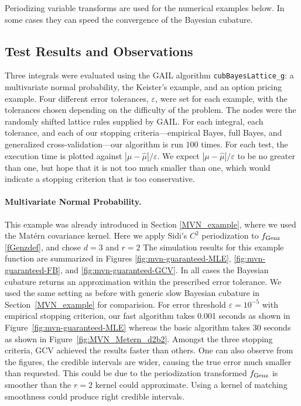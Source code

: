 \documentclass[twocolumn]{svjour3}          %
\newcommand{\hmu}{\widehat{\mu}}
\newcommand{\code}[1]{\texttt{#1}}
\def\abs#1{\ensuremath{\left \lvert #1 \right \rvert}}
\newcommand\figref{Figure~\ref}
\newcommand\secref{Section~\ref}
\begin{document}
Periodizing variable transforms are used for the numerical examples below.  In some cases they can speed the convergence of the Bayesian cubature. 
	



\subsection{Test Results and Observations}

Three integrals were evaluated using the GAIL algorithm \code{cubBayesLattice\_g}:  a multivariate normal probability, the Keister's example, and an option pricing example.  Four different error tolerances, $\varepsilon$,  were set for each example, with the tolerances chosen depending on the difficulty of the problem.  The nodes were the randomly shifted lattice rules supplied by GAIL.  For each integral,  each tolerance, and each of our stopping criteria---empirical Bayes, full Bayes, and generalized cross-validation---our algorithm is run  $100$ times.  For each test, the execution time is plotted against $\abs{\mu - \hmu}/\varepsilon$.  We expect $\abs{\mu - \hmu}/\varepsilon$ to be no greater than one, but hope that it is not too much smaller than one, which would indicate a stopping criterion that is too conservative.


\paragraph{Multivariate Normal Probability.}

This example was already introduced in Section \ref{MVN_example}, where we used the Mat\'ern covariance kernel.  Here we apply Sidi's $C^2$  periodization to $ f_{\textup{Genz}}$ \eqref{fGenzdef}, and chose $d=3$ and $r=2$ The simulation results for this example function are summarized in Figures \ref{fig:mvn-guaranteed-MLE}, \ref{fig:mvn-guaranteed-FB}, and \ref{fig:mvn-guaranteed-GCV}.  In all cases the Bayesian cubature returns an approximation within the prescribed error tolerance. We used the same setting as before with generic slow Bayesian cubature in \secref{MVN_example} for comparision. For error threshold $\varepsilon=10^{-5}$ with empirical stopping criterion, our fast algorithm takes 0.001 seconds as shown in \figref{fig:mvn-guaranteed-MLE} whereas the basic algorithm takes 30 seconds as shown in \figref{fig:MVN_Metern_d2b2}. 
Amongst the three stopping criteria, GCV achieved the results faster than others. 
One can also observe from the figures, the credible intervals are wider, causing the true error much smaller than requested.
This could be due to the periodization transformed $f_\textup{Genz}$ is smoother than the $r=2$ kernel could approximate. Using a kernel of matching smoothness could produce right credible intervals.
\end{document}
